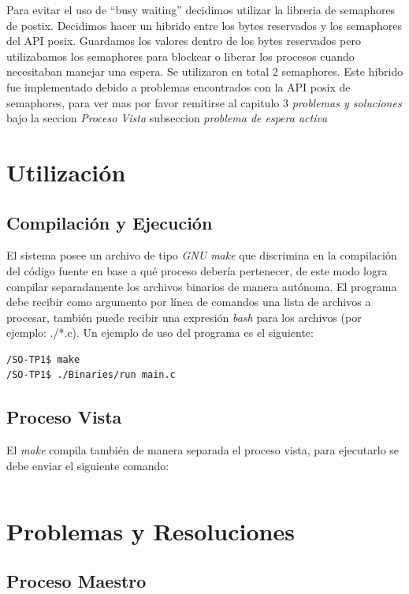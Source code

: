 \documentclass[10pt,a4paper]{report}
\begin{document}
Para evitar el uso de “busy waiting” decidimos utilizar la libreria de semaphores de postix. Decidimos hacer un hibrido entre los bytes reservados y los semaphores del API posix. Guardamos los valores dentro de los bytes reservados pero utilizabamos los semaphores para blockear o liberar los procesos cuando necesitaban manejar una espera. Se utilizaron en total 2 semaphores.
Este hibrido fue implementado debido a problemas encontrados con la API posix de semaphores, para ver mas por favor remitirse al capitulo 3 \emph{problemas y soluciones} bajo la seccion \emph{Proceso Vista} subseccion \emph{problema de espera activa}

\chapter{Utilización}
\section{Compilación y Ejecución}
El sistema posee un archivo de tipo \textit{GNU make} que discrimina en la compilación del código fuente en base a qué proceso debería pertenecer, de este modo logra compilar separadamente los archivos binarios de manera autónoma. El programa debe recibir como argumento por línea de comandos una lista de archivos a procesar, también puede recibir una expresión \textit{bash} para los archivos (por ejemplo: ./*.c). Un ejemplo de uso del programa es el siguiente:
\begin{lstlisting}
/SO-TP1$ make
/SO-TP1$ ./Binaries/run main.c
\end{lstlisting}


\section{Proceso Vista}
El \textit{make} compila también de manera separada el proceso vista, para ejecutarlo se debe enviar el siguiente comando:
\begin{lstlisting}
\end{lstlisting}


\chapter{Problemas y Resoluciones}
\section{Proceso Maestro}
\end{document}
